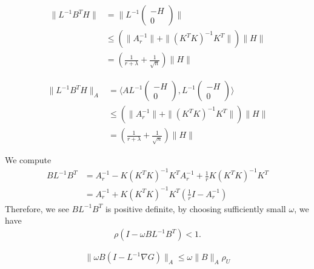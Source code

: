\begin{equation}
\begin{aligned}
   \| L^{-1} B^T H \| & = \| L^{-1}  \begin{pmatrix}
   -H \\
   0
   \end{pmatrix}\|  \\
   & \leq \left(\|A_r^{-1}\| +\| (K^T K)^{-1}K^T \|\right) \|H\| \\
   & = (\frac{1}{r + \lambda } + \frac{1}{\sqrt{n}} ) \|H\| 
\end{aligned}
\end{equation}


\begin{equation}
\begin{aligned}
   \| L^{-1} B^T H \|_A & = \langle A L^{-1}  \begin{pmatrix}
   -H \\
   0
   \end{pmatrix},  L^{-1}  \begin{pmatrix}
   -H \\
   0
   \end{pmatrix} \rangle  \\
   & \leq \left(\|A_r^{-1}\| +\| (K^T K)^{-1}K^T \|\right) \|H\| \\
   & = (\frac{1}{r + \lambda } + \frac{1}{\sqrt{n}} ) \|H\| 
\end{aligned}
\end{equation}


We compute 
\begin{equation}
\begin{aligned}
       BL^{-1}B^T & = A_r^{-1} - K (K^T K)^{-1} K^T A_r^{-1} + \frac{1}{r}K (K^T K)^{-1}K^T \\
       & = A_r^{-1} + K (K^T K)^{-1} K^T (\frac{1}{r} I - A_r^{-1})
\end{aligned}
\end{equation}
Therefore, we see $BL^{-1} B^T$ is positive definite, by choosing sufficiently small $\omega$, we have
\begin{equation}
\begin{aligned}
   \rho ( I - \omega B L^{-1} B^T ) < 1 .
\end{aligned}
\end{equation}

\begin{equation}
     \| \omega B (I - L^{-1} \nabla G) \|_A \leq \omega \|B \|_A \rho_U
\end{equation}



